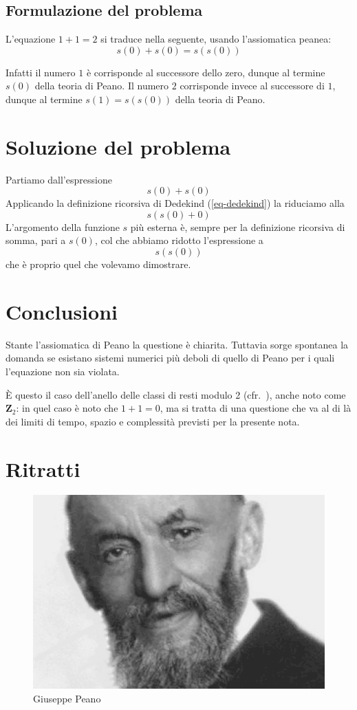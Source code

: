 \documentclass[a4paper,14pt]{report}
\begin{document}
\section{Formulazione del problema}

L'equazione $1+1=2$ si traduce nella seguente, usando l'assiomatica peanea:
\[
    s(0)+s(0) = s(s(0))
\]

Infatti il numero $1$ è corrisponde al successore dello zero, dunque al termine $s(0)$ della teoria di Peano. Il numero $2$ corrisponde invece al successore di $1$, dunque al termine $s(1)=s(s(0))$ della teoria di Peano.

\chapter{Soluzione del problema}

Partiamo dall'espressione
\[
    s(0)+s(0)
\]
Applicando la definizione ricorsiva di Dedekind (\ref{eq-dedekind}) la riduciamo alla
\[
    s(s(0)+0)
\]
L'argomento della funzione $s$ più esterna è, sempre per la definizione ricorsiva di somma, pari a $s(0)$, col che abbiamo ridotto l'espressione a
\[
    s(s(0))
\]
che è proprio quel che volevamo dimostrare.

\chapter*{Conclusioni}

Stante l'assiomatica di Peano la questione è chiarita. Tuttavia sorge spontanea la domanda se esistano sistemi numerici più deboli di quello di Peano per i quali l'equazione non sia violata.

\`E questo il caso dell'anello delle classi di resti modulo 2 (cfr.\ \cite{gauss}), anche noto come ${\mathbf Z}_2$: in quel caso è noto che $1+1=0$, ma si tratta di una questione che va al di là dei limiti di tempo, spazio e complessità previsti per la presente nota.

\appendix
\chapter{Ritratti}

\begin{figure}[h!]
\centering
\includegraphics[width=.7\textwidth]{peano.png}
\caption{Giuseppe Peano}
\end{figure}
\end{document}
